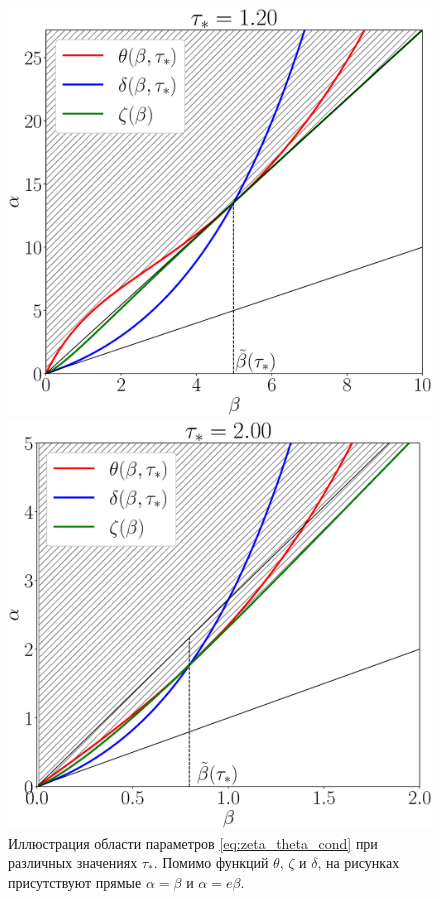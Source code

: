 \begin{figure}
	\centering
	\begin{minipage}{.45\linewidth}
		\includegraphics[width=\linewidth]{images/conditions_tau_1p20.eps}
	\end{minipage}
	\hspace{.05\linewidth}
	\begin{minipage}{.45\linewidth}
		\includegraphics[width=\linewidth]{images/conditions_tau_2p00.eps}
	\end{minipage}
	\caption{Иллюстрация области параметров \eqref{eq:zeta_theta_cond} при различных значениях $\tau_*$. Помимо функций $\theta$, $\zeta$ и $\delta$, на рисунках присутствуют прямые $\alpha = \beta$ и $\alpha = e\beta$.}
	\label{fig:step3_t1}
\end{figure}

